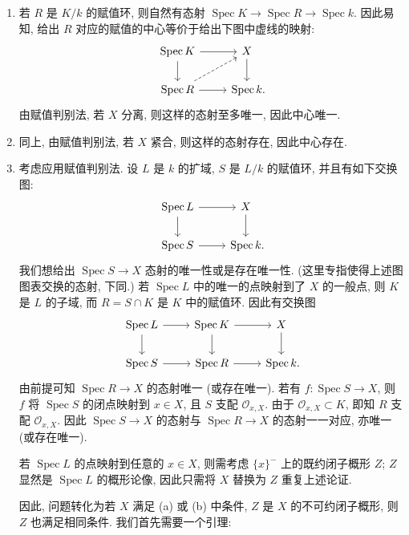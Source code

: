 \documentclass{article}
\theoremstyle{exercise}
\theoremstyle{plain}
\theoremstyle{remark}
\newenvironment{proofc}{\proof}{\endproof}
\def\sO{\mathscr{O}}
\def\Spec{\operatorname{Spec}}
\begin{document}
\begin{proofc}
  \begin{enumerate}[label=(\alph*)]
    \item 若 $R$ 是 $K / k$ 的赋值环, 则自然有态射 $\Spec K \to \Spec R \to \Spec k$.
          因此易知, 给出 $R$ 对应的赋值的中心等价于给出下图中虚线的映射:
          \[\begin{tikzcd}
              \Spec K \ar[r] \ar[d] & X \ar[d] \\
              \Spec R \ar[r] \ar[ur, dashed] & \Spec k\rlap{.}
            \end{tikzcd}\]
          由赋值判别法, 若 $X$ 分离, 则这样的态射至多唯一, 因此中心唯一.
    \item 同上, 由赋值判别法, 若 $X$ 紧合, 则这样的态射存在, 因此中心存在.
    \item 考虑应用赋值判别法. 设 $L$ 是 $k$ 的扩域, $S$ 是 $L / k$ 的赋值环,
          并且有如下交换图:
          \[\begin{tikzcd}
              \Spec L \ar[r] \ar[d] & X \ar[d] \\
              \Spec S \ar[r] & \Spec k\rlap{.}
            \end{tikzcd}\]
          我们想给出 $\Spec S \to X$ 态射的唯一性或是存在唯一性.
          (这里专指使得上述图图表交换的态射, 下同.)
          若 $\Spec L$ 中的唯一的点映射到了 $X$ 的一般点,
          则 $K$ 是 $L$ 的子域, 而 $R = S \cap K$ 是 $K$ 中的赋值环.
          因此有交换图
          \[\begin{tikzcd}
              \Spec L \ar[r] \ar[d] & \Spec K \ar[r] \ar[d] & X \ar[d] \\
              \Spec S \ar[r] & \Spec R \ar[r] & \Spec k\rlap{.}
            \end{tikzcd}\]
          由前提可知 $\Spec R \to X$ 的态射唯一 (或存在唯一).
          若有 $f \colon \Spec S \to X$,
          则 $f$ 将 $\Spec S$ 的闭点映射到 $x \in X$, 且 $S$ 支配 $\sO_{x, X}$.
          由于 $\sO_{x, X} \subset K$, 即知 $R$ 支配 $\sO_{x, X}$.
          因此 $\Spec S \to X$ 的态射与 $\Spec R \to X$ 的态射一一对应,
          亦唯一 (或存在唯一).

          若 $\Spec L$ 的点映射到任意的 $x \in X$,
          则需考虑 $\{ x \}^{-}$ 上的既约闭子概形 $Z$;
          $Z$ 显然是 $\Spec L$ 的概形论像, 因此只需将 $X$ 替换为 $Z$ 重复上述论证.

          因此, 问题转化为若 $X$ 满足 (a) 或 (b) 中条件,
          $Z$ 是 $X$ 的不可约闭子概形, 则 $Z$ 也满足相同条件.
          我们首先需要一个引理:


\end{enumerate}
\end{proofc}
\end{document}
